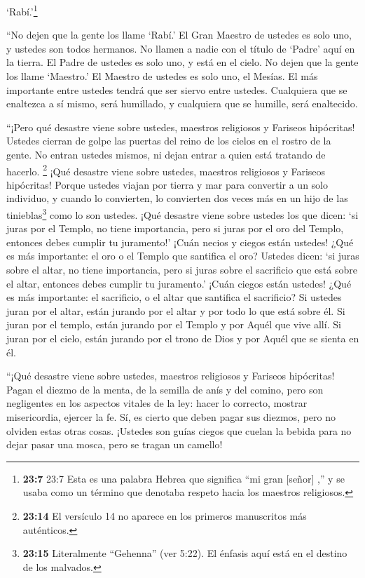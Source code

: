 `Rabí.'\footnote{\textbf{23:7} 23:7 Esta es una palabra Hebrea que
  significa ``mi gran {[}señor{]} ,'' y se usaba como un término que
  denotaba respeto hacia los maestros religiosos.}

 ``No dejen que la gente los llame `Rabí.' El Gran Maestro
de ustedes es solo uno, y ustedes son todos hermanos.  No
llamen a nadie con el título de `Padre' aquí en la tierra. El Padre de
ustedes es solo uno, y está en el cielo.  No dejen que la
gente los llame `Maestro.' El Maestro de ustedes es solo uno, el Mesías.
 El más importante entre ustedes tendrá que ser siervo
entre ustedes.  Cualquiera que se enaltezca a sí mismo,
será humillado, y cualquiera que se humille, será enaltecido.

 ``¡Pero qué desastre viene sobre ustedes, maestros
religiosos y Fariseos hipócritas! Ustedes cierran de golpe las puertas
del reino de los cielos en el rostro de la gente. No entran ustedes
mismos, ni dejan entrar a quien está tratando de hacerlo. 
\footnote{\textbf{23:14} El versículo 14 no aparece en los primeros
  manuscritos más auténticos.}  ¡Qué desastre viene sobre
ustedes, maestros religiosos y Fariseos hipócritas! Porque ustedes
viajan por tierra y mar para convertir a un solo individuo, y cuando lo
convierten, lo convierten dos veces más en un hijo de las
tinieblas\footnote{\textbf{23:15} Literalmente ``Gehenna'' (ver 5:22).
  El énfasis aquí está en el destino de los malvados.} como lo son
ustedes.  ¡Qué desastre viene sobre ustedes los que dicen:
`si juras por el Templo, no tiene importancia, pero si juras por el oro
del Templo, entonces debes cumplir tu juramento!' ¡Cuán necios y ciegos
están ustedes!  ¿Qué es más importante: el oro o el Templo
que santifica el oro?  Ustedes dicen: `si juras sobre el
altar, no tiene importancia, pero si juras sobre el sacrificio que está
sobre el altar, entonces debes cumplir tu juramento.' 
¡Cuán ciegos están ustedes! ¿Qué es más importante: el sacrificio, o el
altar que santifica el sacrificio?  Si ustedes juran por el
altar, están jurando por el altar y por todo lo que está sobre él.
 Si juran por el templo, están jurando por el Templo y por
Aquél que vive allí.  Si juran por el cielo, están jurando
por el trono de Dios y por Aquél que se sienta en él.

 ``¡Qué desastre viene sobre ustedes, maestros religiosos y
Fariseos hipócritas! Pagan el diezmo de la menta, de la semilla de anís
y del comino, pero son negligentes en los aspectos vitales de la ley:
hacer lo correcto, mostrar misericordia, ejercer la fe. Sí, es cierto
que deben pagar sus diezmos, pero no olviden estas otras cosas.
 ¡Ustedes son guías ciegos que cuelan la bebida para no
dejar pasar una mosca, pero se tragan un camello!

